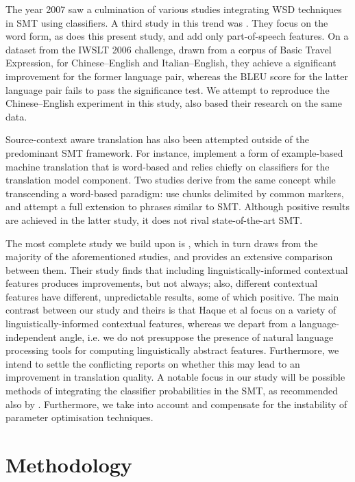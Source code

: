 The year 2007 saw a culmination of various studies integrating WSD techniques
in SMT using classifiers. A third study in this trend was \cite{Stroppa+07}.
They focus on the word form, as does this present study, and add only
part-of-speech features. On a dataset from the IWSLT 2006 challenge, drawn from
a corpus of Basic Travel Expression, for Chinese--English and Italian--English,
they achieve a significant improvement for the former language pair, whereas
the BLEU score for the latter language pair fails to pass the significance
test. We attempt to reproduce the Chinese--English experiment in this study,
\cite{CarpuatWu07} also based their research on the same data.

Source-context aware translation has also been attempted outside of the
predominant SMT framework. For instance, \cite{MBMT} implement a
form of example-based machine translation that is word-based and relies
chiefly on classifiers for the translation model component. Two studies derive
from the same concept while transcending a word-based paradigm:
\cite{MARKERBASED} use chunks delimited by common markers, and \cite{PBMBMT}
attempt a full extension to phrases similar to SMT. Although positive results
are achieved in the latter study, it does not rival state-of-the-art SMT.

The most complete study we build upon is \cite{Rejwanul+11}, which in turn
draws from the majority of the aforementioned studies, and provides an
extensive comparison between them. Their study finds that including
linguistically-informed contextual features produces improvements, but not
always; also, different contextual features have different, unpredictable
results, some of which positive. The main contrast between our study and theirs
is that Haque et al focus on a variety of linguistically-informed contextual
features, whereas we depart from a language-independent angle, i.e. we do not
presuppose the presence of natural language processing tools for computing
linguistically abstract features. Furthermore, we intend to settle the
conflicting reports on whether this may lead to an improvement in translation
quality. A notable focus in our study will be possible methods of integrating
the classifier probabilities in the SMT, as recommended also by
\cite{Gimenez+07}. Furthermore, we take into account and compensate for the
instability of parameter optimisation techniques.


\section{Methodology}
\label{sec:methodology}

